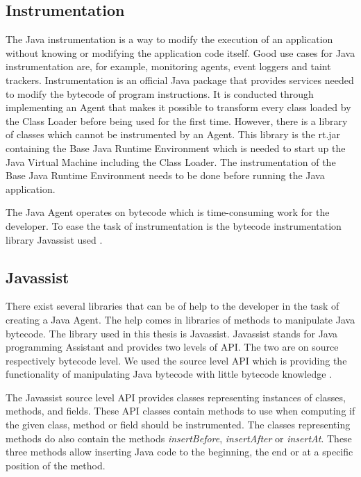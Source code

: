 \subsection{Instrumentation}
The Java instrumentation is a way to modify the execution of an application without knowing or modifying the application code itself. Good use cases for Java instrumentation are, for example, monitoring agents, event loggers and taint trackers. Instrumentation is an official Java package that provides services needed to modify the bytecode of program instructions. It is conducted through implementing an Agent that makes it possible to transform every class loaded by the Class Loader before being used for the first time. However, there is a library of classes which cannot be instrumented by an Agent. This library is the rt.jar containing the Base Java Runtime Environment which is needed to start up the Java Virtual Machine including the Class Loader. The instrumentation of the Base Java Runtime Environment needs to be done before running the Java application.

The Java Agent operates on bytecode which is time-consuming work for the developer. To ease the task of instrumentation is the bytecode instrumentation library Javassist used \parencite{Java_Instrument, Javassist}.



\subsection{Javassist}
There exist several libraries that can be of help to the developer in the task of creating a Java Agent. The help comes in libraries of methods to manipulate Java bytecode. The library used in this thesis is Javassist. Javassist stands for Java programming Assistant and provides two levels of API. The two are on source respectively bytecode level. We used the source level API which is providing the functionality of manipulating Java bytecode with little bytecode knowledge \parencite{Javassist}.

The Javassist source level API provides classes representing instances of classes, methods, and fields. These API classes contain methods to use when computing if the given class, method or field should be instrumented. The classes representing methods do also contain the methods \textit{insertBefore}, \textit{insertAfter} or \textit{insertAt}. These three methods allow inserting Java code to the beginning, the end or at a specific position of the method.
